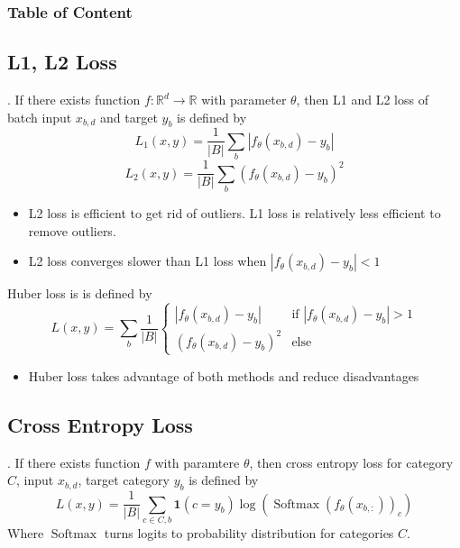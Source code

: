 \documentclass[8pt]{beamer}
\newcommand{\mbb}[1]{\mathbb{#1}}
\newcommand{\mb}[1]{\mathbf{#1}}
\newcommand{\abs}[1]{\left\lvert #1 \right\rvert}
\newcommand{\Softmax}[1]{\operatorname{Softmax}\!\left(#1\right)}
\begin{document}
\begingroup
    \begin{frame}
        \frametitle{Table of Content}
        \tableofcontents
    \end{frame}
\endgroup

\subsection{L1, L2 Loss}

\begin{frame}{.}
    If there exists function $f: \mbb{R}^d \to \mbb{R}$ with parameter $\theta$, then L1 and L2 loss of batch input $x_{b,d}$ and target $y_{b}$ is defined by
    \[
    L_1(x,y) = \frac{1}{\abs{B}}\sum_{b}\abs{f_\theta(x_{b,d}) - y_{b}}
    \]
    \[
    L_2(x,y) = \frac{1}{\abs{B}}\sum_{b} (f_\theta(x_{b,d}) - y_{b})^2
    \]

    \begin{itemize}
        \item L2 loss is efficient to get rid of outliers. L1 loss is relatively less efficient to remove outliers.
        \item L2 loss converges slower than L1 loss when $\abs{f_\theta(x_{b,d}) - y_b} < 1$
    \end{itemize}

    Huber loss is is defined by
    \[
        L(x,y)=\sum_b \frac{1}{\abs{B}}\begin{cases}
            \abs{f_\theta(x_{b,d}) - y_b} & \text{if } \abs{f_\theta(x_{b,d}) - y_b} > 1 \\
            (f_\theta(x_{b,d}) - y_b)^2 & \text{else} 
        \end{cases}
    \]
    \begin{itemize}
        \item Huber loss takes advantage of both methods and reduce disadvantages
    \end{itemize}
\end{frame}

\subsection{Cross Entropy Loss}

\begin{frame}{.}
    If there exists function $f$ with paramtere $\theta$, then cross entropy loss for category $C$, input $x_{b,d}$, target category $y_{b}$ is defined by
    \[
        L(x,y) = \frac{1}{\abs{B}} \sum_{c \in C, b} \mb{1}(c = y_b) \log{( \Softmax{f_\theta(x_{b, :})}_{c})}
    \]
    Where $\operatorname{Softmax}$ turns logits to probability distribution for categories $C$.
\end{frame}
\end{document}

